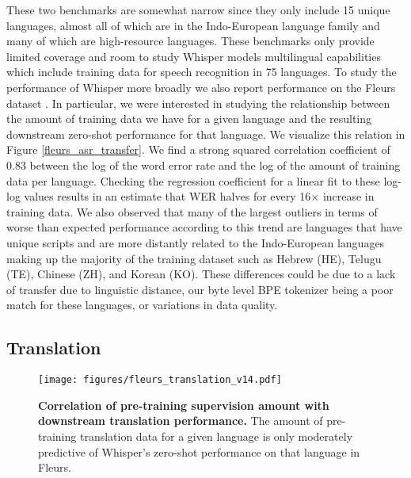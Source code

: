 These two benchmarks are somewhat narrow since they only include 15 unique languages, almost all of which are in the Indo-European language family and many of which are high-resource languages. These benchmarks only provide limited coverage and room to study Whisper models multilingual capabilities which include training data for speech recognition in 75 languages. To study the performance of Whisper more broadly we also report performance on the Fleurs dataset \cite{conneau2022fleurs}. In particular, we were interested in studying the relationship between the amount of training data we have for a given language and the resulting downstream zero-shot performance for that language. We visualize this relation in Figure \ref{fleurs_asr_transfer}. We find a strong squared correlation coefficient of 0.83 between the log of the word error rate and the log of the amount of training data per language. Checking the regression coefficient for a linear fit to these log-log values results in an estimate that WER halves for every 16$\times$ increase in training data. We also observed that many of the largest outliers in terms of worse than expected performance according to this trend are languages that have unique scripts and are more distantly related to the Indo-European languages making up the majority of the training dataset such as Hebrew ({\footnotesize\textsf{HE}}), Telugu ({\footnotesize\textsf{TE}}), Chinese ({\footnotesize\textsf{ZH}}), and Korean ({\footnotesize\textsf{KO}}). These differences could be due to a lack of transfer due to linguistic distance, our byte level BPE tokenizer being a poor match for these languages, or variations in data quality.

\subsection{Translation}\label{subsec:cross-lingual}

\begin{figure}[t]
\begin{center}
\centerline{\texttt{[image: figures/fleurs\_translation\_v14.pdf]}}
\caption{\textbf{Correlation of pre-training supervision amount with downstream translation performance.} The amount of pre-training translation data for a given language is only moderately predictive of Whisper's zero-shot performance on that language in Fleurs.}
\label{translation_transfer}
\end{center}
\vspace{-1em}
\end{figure}

